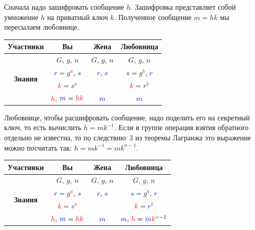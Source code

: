 Сначала надо зашифровать сообщение $h$. Зашифровка представляет собой умножение $h$ на приватный ключ $k$. Полученное сообщение $m = hk$ мы пересылаем любовнице.
\begin{center}
\begin{tabular}{|c|c|c|c|}
\hline
{\bf Участники}&{Вы}&{Жена}&{Любовница}\\
\hline
\multirow{4}{*}{\bf Знания}&{\textcolor{OliveGreen}{$G$}, \textcolor{OliveGreen}{$g$}, \textcolor{OliveGreen}{$n$}}&{\textcolor{OliveGreen}{$G$}, \textcolor{OliveGreen}{$g$}, \textcolor{OliveGreen}{$n$}}&{\textcolor{OliveGreen}{$G$}, \textcolor{OliveGreen}{$g$}, \textcolor{OliveGreen}{$n$}}\\
{}&{ \textcolor{blue}{$r$}$=$\textcolor{OliveGreen}{$ g$}\textcolor{red}{${}^a$}, \textcolor{blue}{$s$}}&{\textcolor{blue}{$r$, $s$}}&{ \textcolor{blue}{$s$}$=$\textcolor{OliveGreen}{$g$}\textcolor{red}{${}^b$}, \textcolor{blue}{$r$}}\\
{}&{ \textcolor{red}{$k$}$=$\textcolor{blue}{$s$}\textcolor{red}{${}^a$}}&{}&{ \textcolor{red}{$k$}$=$\textcolor{blue}{$r$}\textcolor{red}{${}^b$}}\\
{}&{\textcolor{red}{$h$}, $\textcolor{blue}{m} = \textcolor{red}{hk}$}&{\textcolor{blue}{$m$}}&{\textcolor{blue}{$m$}}\\
\hline
\end{tabular}
\end{center}

Любовнице, чтобы расшифровать сообщение, надо поделить его на секретный ключ, то есть вычислить $h = m k^{-1}$. Если в группе операция взятия обратного отдельно не известна, то по следствию~3 из теоремы Лагранжа это выражение можно посчитать так: $h = m k^{-1} = m k^{n - 1}$.
\begin{center}
\begin{tabular}{|c|c|c|c|}
\hline
{\bf Участники}&{Вы}&{Жена}&{Любовница}\\
\hline
\multirow{4}{*}{\bf Знания}&{\textcolor{OliveGreen}{$G$}, \textcolor{OliveGreen}{$g$}, \textcolor{OliveGreen}{$n$}}&{\textcolor{OliveGreen}{$G$}, \textcolor{OliveGreen}{$g$}, \textcolor{OliveGreen}{$n$}}&{\textcolor{OliveGreen}{$G$}, \textcolor{OliveGreen}{$g$}, \textcolor{OliveGreen}{$n$}}\\
{}&{ \textcolor{blue}{$r$}$=$\textcolor{OliveGreen}{$ g$}\textcolor{red}{${}^a$}, \textcolor{blue}{$s$}}&{\textcolor{blue}{$r$, $s$}}&{ \textcolor{blue}{$s$}$=$\textcolor{OliveGreen}{$g$}\textcolor{red}{${}^b$}, \textcolor{blue}{$r$}}\\
{}&{ \textcolor{red}{$k$}$=$\textcolor{blue}{$s$}\textcolor{red}{${}^a$}}&{}&{ \textcolor{red}{$k$}$=$\textcolor{blue}{$r$}\textcolor{red}{${}^b$}}\\
{}&{\textcolor{red}{$h$}, $\textcolor{blue}{m} = \textcolor{red}{hk}$}&{\textcolor{blue}{$m$}}&{\textcolor{blue}{$m$}, $\textcolor{red}{h} = \textcolor{blue}{m} \textcolor{red}{k}^{\textcolor{OliveGreen}{n}-1}$}\\
\hline
\end{tabular}
\end{center}


